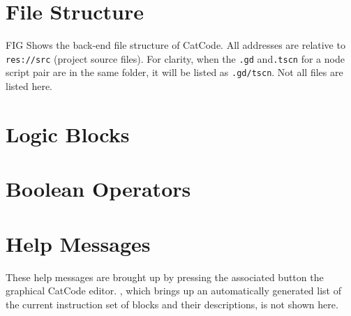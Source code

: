 
\section{File Structure}

FIG Shows the back-end file structure of CatCode. All addresses are relative to \texttt{res://src} (project source files). For clarity, when the \texttt{.gd} and\texttt{.tscn} for a node script pair are in the same folder, it will be listed as \texttt{.gd/tscn}. Not all files are listed here.



\section{Logic Blocks}



\section{Boolean Operators}



\break
\section{Help Messages}

These help messages are brought up by pressing the associated button the graphical CatCode editor. , which brings up an automatically generated list of the current instruction set of blocks and their descriptions, is not shown here.

